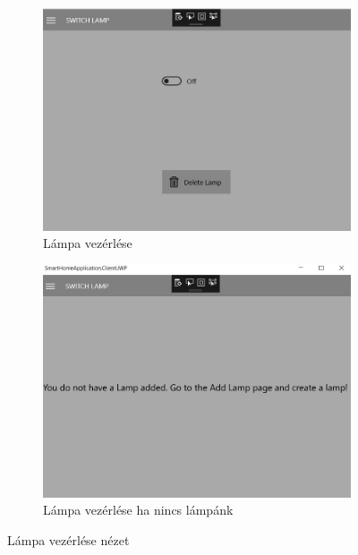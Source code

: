 \documentclass[a4paper,12pt]{report}
\begin{document}
    \begin{figure}[H]
        \centering
        \begin{subfigure}[b]{0.4\linewidth}
            \includegraphics[width=\linewidth]{images/switchview.jpg}
            \caption{Lámpa vezérlése}
        \end{subfigure}
        \begin{subfigure}[b]{0.4\linewidth}
            \includegraphics[width=\linewidth]{images/switchdonthavelamp.jpg}
            \caption{Lámpa vezérlése ha nincs lámpánk}
        \end{subfigure}
        \caption{Lámpa vezérlése nézet}
        \label{fig:SwitchLampView}
    \end{figure}
\end{document}
